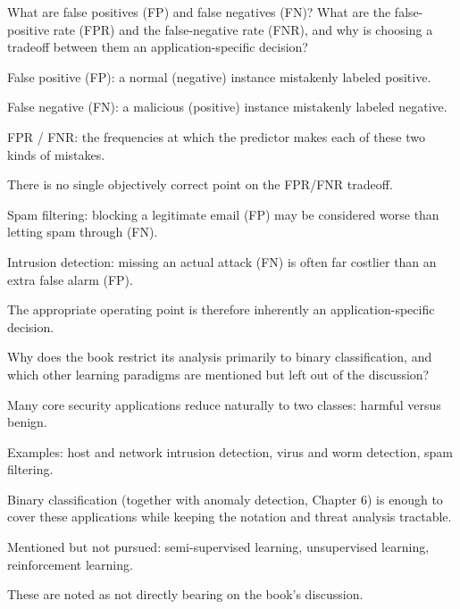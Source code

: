 \documentclass[10pt]{extarticle}
\newcommand{\resposta}[1]{\par\smallskip\noindent #1}
\begin{document}
\begin{questoes}
\item What are false positives (FP) and false negatives (FN)? What are the false-positive rate (FPR) and the false-negative rate (FNR), and why is choosing a tradeoff between them an application-specific decision?

\resposta{
\begin{topicos}
\item False positive (FP): a normal (negative) instance mistakenly labeled positive.
\item False negative (FN): a malicious (positive) instance mistakenly labeled negative.
\item FPR / FNR: the frequencies at which the predictor makes each of these two kinds of mistakes.
\item There is no single objectively correct point on the FPR/FNR tradeoff.
\item Spam filtering: blocking a legitimate email (FP) may be considered worse than letting spam through (FN).
\item Intrusion detection: missing an actual attack (FN) is often far costlier than an extra false alarm (FP).
\item The appropriate operating point is therefore inherently an application-specific decision.
\end{topicos}
}

\item Why does the book restrict its analysis primarily to binary classification, and which other learning paradigms are mentioned but left out of the discussion?

\resposta{
\begin{topicos}
\item Many core security applications reduce naturally to two classes: harmful versus benign.
\item Examples: host and network intrusion detection, virus and worm detection, spam filtering.
\item Binary classification (together with anomaly detection, Chapter 6) is enough to cover these applications while keeping the notation and threat analysis tractable.
\item Mentioned but not pursued: semi-supervised learning, unsupervised learning, reinforcement learning.
\item These are noted as not directly bearing on the book's discussion.
\end{topicos}
}

\end{questoes}
\end{document}
